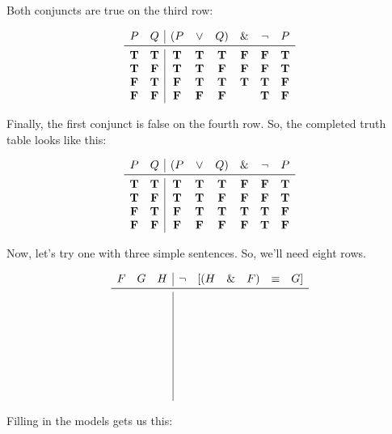 \documentclass[../logic-text.tex]{subfiles}
\begin{document}
Both conjuncts are true on the third row:

\[
  \begin{array}{cc|cccccc}
    P & Q & (P & \lor & Q) & \land & \lneg & P \\ \midrule
    \true & \true & \true& \true & \true & \false & \false & \true \\
    \true & \false & \true & \true & \false & \false & \false & \true \\
    \false & \true & \false & \true & \true & \true & \true & \false \\
    \false &\false & \false & \false & \false && \true & \false \\
\end{array}
\]

Finally, the first conjunct is false on the fourth row.
So, the completed truth table looks like this:

\[
  \begin{array}{cc|cccccc}
    P & Q & (P & \lor & Q) & \land & \lneg & P \\ \midrule
    \true & \true & \true& \true & \true & \false & \false & \true \\
    \true & \false & \true & \true & \false & \false & \false & \true \\
    \false & \true & \false & \true & \true & \true & \true & \false \\
    \false &\false & \false & \false & \false & \false & \true & \false \\
\end{array}
\]


Now, let's try one with three simple sentences.
So, we'll need eight rows.


\[
\begin{array}{ccc|cccccc}
  F & G & H & \lneg & [(H & \land & F) & \liff & G] \\ \midrule
  \phantom{x}&&&&&&&& \\
  \phantom{x} &&&&&&&\\
  \phantom{x} &&&&&&&\\
  \phantom{x} &&&&&&&\\
  \phantom{x} &&&&&&&\\
  \phantom{x} &&&&&&&\\
  \phantom{x} &&&&&&&\\
  \phantom{x} &&&&&&&\\


\end{array}
\]

Filling in the models gets us this:
\end{document}
